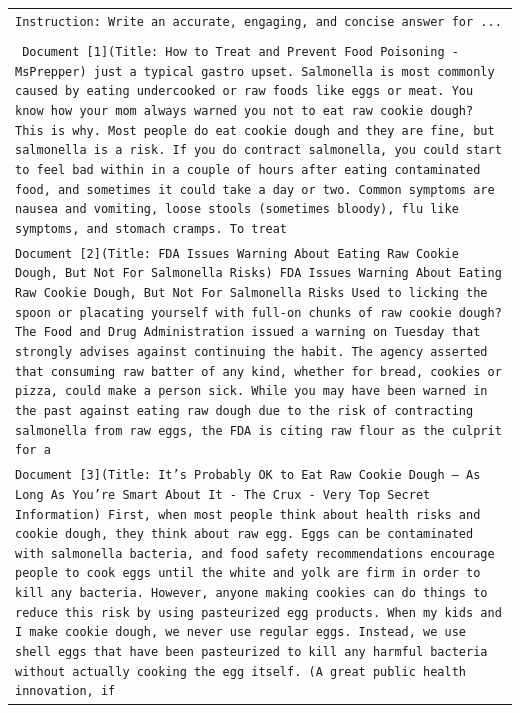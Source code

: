\begin{table}[h]
    \centering
    \small
    \begin{tabular}{>{\raggedright\arraybackslash\tt}p{}<{}}
        \toprule
            Instruction: Write an accurate, engaging, and concise answer for ... \\
            \\
            \vspace{-1em}
            Document {[1]}(Title: How to Treat and Prevent Food Poisoning - MsPrepper) just a typical gastro upset. Salmonella is most commonly caused by eating undercooked or raw foods like eggs or meat. You know how your mom always warned you not to eat raw cookie dough? This is why. Most people do eat cookie dough and they are fine, but salmonella is a risk. If you do contract salmonella, you could start to feel bad within in a couple of hours after eating contaminated food, and sometimes it could take a day or two. Common symptoms are nausea and vomiting, loose stools (sometimes bloody), flu like symptoms, and stomach cramps. To treat \\
            Document {[2]}(Title: FDA Issues Warning About Eating Raw Cookie Dough, But Not For Salmonella Risks) FDA Issues Warning About Eating Raw Cookie Dough, But Not For Salmonella Risks Used to licking the spoon or placating yourself with full-on chunks of raw cookie dough? The Food and Drug Administration issued a warning on Tuesday that strongly advises against continuing the habit. The agency asserted that consuming raw batter of any kind, whether for bread, cookies or pizza, could make a person sick. While you may have been warned in the past against eating raw dough due to the risk of contracting salmonella from raw eggs, the FDA is citing raw flour as the culprit for a \\
            Document {[3]}(Title: It's Probably OK to Eat Raw Cookie Dough — As Long As You're Smart About It - The Crux - Very Top Secret Information) First, when most people think about health risks and cookie dough, they think about raw egg. Eggs can be contaminated with salmonella bacteria, and food safety recommendations encourage people to cook eggs until the white and yolk are firm in order to kill any bacteria. However, anyone making cookies can do things to reduce this risk by using pasteurized egg products. When my kids and I make cookie dough, we never use regular eggs. Instead, we use shell eggs that have been pasteurized to kill any harmful bacteria without actually cooking the egg itself. (A great public health innovation, if \\

\end{tabular}
\end{table}
